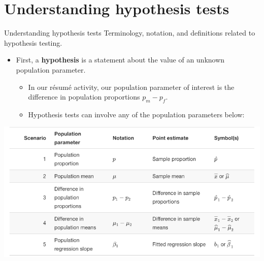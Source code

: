\documentclass[
  ignorenonframetext,
]{beamer}
\providecommand{\tightlist}{%
  \setlength{\itemsep}{0pt}\setlength{\parskip}{0pt}}
\begin{document}
\hypertarget{understanding-hypothesis-tests}{%
\section{Understanding hypothesis
tests}\label{understanding-hypothesis-tests}}

\begin{frame}{Understanding hypothesis tests}
\protect\hypertarget{understanding-hypothesis-tests-1}{}
Terminology, notation, and definitions related to hypothesis testing.

\begin{itemize}
\item
  First, a \textbf{hypothesis} is a statement about the value of an
  unknown population parameter.

  \begin{itemize}
  \tightlist
  \item
    In our résumé activity, our population parameter of interest is the
    difference in population proportions \(p_m - p_f\).
  \item
    Hypothesis tests can involve any of the population parameters below:
  \end{itemize}
\end{itemize}

\begin{center}\includegraphics[width=0.7\linewidth,height=0.5\textheight]{week12_5} \end{center}
\end{frame}
\end{document}
